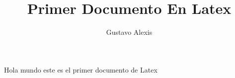 \documentclass[10pt,a4paper]{book}
\author{Gustavo Alexis }
\title{Primer Documento En Latex}
\begin{document}
Hola  mundo este es el primer documento de Latex
\end{document}
